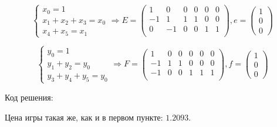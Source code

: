 \documentclass{article}
\begin{document}
    \begin{equation*}
        \begin{cases} 
            x_0 = 1 \\ 
            x_1 + x_2 + x_3 = x_0\\
            x_4 + x_5 = x_1
        \end{cases} \Rightarrow
        E = \left(
        \begin{matrix}
            1 & 0 & 0 & 0 & 0 & 0\\
            -1 & 1 & 1 & 1 & 0 & 0\\
            0 & -1 & 0 & 0 & 1 & 1 \\
        \end{matrix}
        \right),
        e = \left(
        \begin{matrix}
            1\\
            0\\
            0
        \end{matrix}
        \right)
    \end{equation*}
    
    \begin{equation*}
        \begin{cases} 
            y_0 = 1 \\ 
            y_1 + y_2 = y_0\\
            y_3 + y_4 + y_5 = y_0
        \end{cases} \Rightarrow
        F = \left(
        \begin{matrix}
            1 & 0 & 0 & 0 & 0 & 0\\
            -1 & 1 & 1 & 0 & 0 & 0\\
            -1 & 0 & 0 & 1 & 1 & 1 \\
        \end{matrix}
        \right),
        f = \left(
        \begin{matrix}
            1\\
            0\\
            0
        \end{matrix}
        \right)
    \end{equation*}
    \bigbreak
    
    Код решения:
     
    
    \newpage
    Цена игры такая же, как и в первом пункте: $1.2093$.
    
\end{document}
